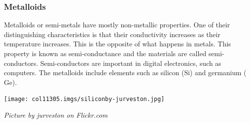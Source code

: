             \subsubsection{ Metalloids}
            \nopagebreak
\begin{minipage}{.5\textwidth}
        \label{m38708*id66042}Metalloids or semi-metals have mostly non-metallic properties. One of their distinguishing characteristics is that their conductivity increases as their temperature increases. This is the opposite of what happens in metals. This property is known as semi-conductance and the materials are called semi-conductors. Semi-conductors are important in digital electronics, such as computers. The metalloids include elements such as silicon ($\mathrm{Si}$) and germanium ($\mathrm{Ge}$).\par 
\end{minipage}
\begin{minipage}{.5\textwidth}
\begin{center}
 \texttt{[image: col11305.imgs/siliconby-jurveston.jpg]}\par
\textit{Picture by jurveston on Flickr.com}
\end{center}
\end{minipage}
\par \label{m38708*eip-586}\vspace{.5cm} 
      \noindent
